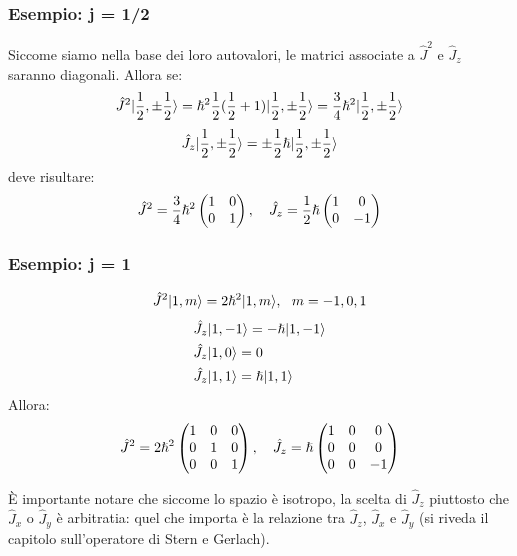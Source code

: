 \subsubsection*{Esempio: j = 1/2}
Siccome siamo nella base dei loro autovalori, le matrici associate a $\hat J^2$ e $\hat J_z$ saranno diagonali. Allora se:
\[
	\hat J^2 | \frac{1}{2}, \pm\frac{1}{2} \rangle = \hslash^2\frac{1}{2}(\frac{1}{2}+1)| \frac{1}{2}, \pm\frac{1}{2} \rangle = \frac{3}{4}\hslash^2| \frac{1}{2}, \pm\frac{1}{2} \rangle \]\[
	\hat J_z | \frac{1}{2}, \pm\frac{1}{2} \rangle = \pm\frac{1}{2}\hslash | \frac{1}{2}, \pm\frac{1}{2} \rangle
\]
deve risultare:
\[
	\hat J^2 = \frac{3}{4}\hslash^2 \begin{pmatrix}
		1 & 0 \\
		0 & 1
	\end{pmatrix}, \ \ \  
	\hat J_z = \frac{1}{2}\hslash \begin{pmatrix}
		1 & 0 \\
		0 & -1
	\end{pmatrix}
\]

\subsubsection*{Esempio: j = 1}
\[
	\hat J^2 | 1, m \rangle = 2\hslash^2| 1, m \rangle, \ \ m = -1, 0, 1
\]
\begin{align*}
	&\hat J_z | 1, -1 \rangle = -\hslash | 1, -1 \rangle \\
	&\hat J_z | 1, 0 \rangle = 0 \\
	&\hat J_z | 1, 1 \rangle = \hslash | 1, 1 \rangle
\end{align*}
Allora:
\[
	\hat J^2 = 2\hslash^2 \begin{pmatrix}
		1 & 0 & 0 \\
		0 & 1 & 0 \\
		0 & 0 & 1
	\end{pmatrix}, \ \ \  
	\hat J_z = \hslash \begin{pmatrix}
		1 & 0 & 0 \\
		0 & 0 & 0 \\
		0 & 0 & -1
	\end{pmatrix}
\]

È importante notare che siccome lo spazio è isotropo, la scelta di $\hat J_z$ piuttosto che $\hat J_x$ o $\hat J_y$ è arbitratia: quel che importa è la relazione tra $\hat J_z$, $\hat J_x$ e $\hat J_y$ (si riveda il capitolo sull'operatore di Stern e Gerlach).